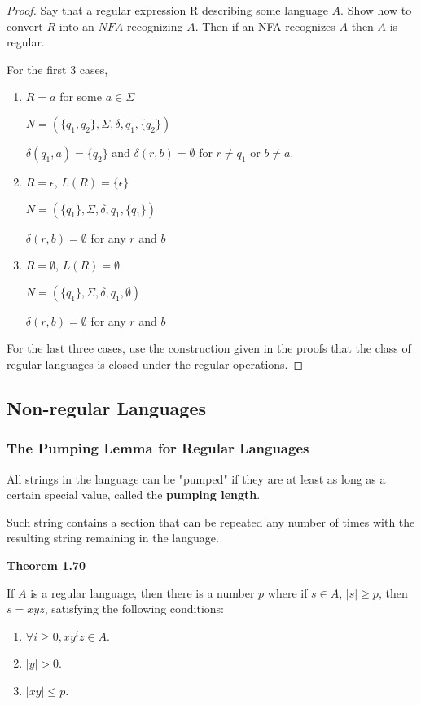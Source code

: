 \begin{mdframed}
\begin{proof}
Say that a regular expression R describing some language $A$. Show how to convert $R$ into an $NFA$ recognizing $A$. Then if  an NFA recognizes $A$ then $A$ is regular.

For the first 3 cases, 
\begin{enumerate}
\item $R=a$ for some $a \in \Sigma$

$N = (\{q_1, q_2\}, \Sigma, \delta, q_1, \{q_2\})$

$\delta(q_1, a) = \{q_2\}$ and $\delta(r, b) = \emptyset$ for $r\neq q_1$ or $b \neq a$.

\item $R = \epsilon$, $L(R) = \{\epsilon\}$

$N = (\{q_1\}, \Sigma, \delta, q_1, \{q_1\})$

$\delta(r, b) = \emptyset$ for any $r$ and $b$

\item $R = \emptyset$, $L(R) = \emptyset$

$N = (\{q_1\}, \Sigma, \delta, q_1, \emptyset)$

$\delta(r, b) = \emptyset$ for any $r$ and $b$
\end{enumerate}

For the last three cases, use the construction given in the proofs that the class of regular languages is closed under the regular operations.
\end{proof}
\end{mdframed}

\subsection{Non-regular Languages}

\subsubsection{The Pumping Lemma for Regular Languages}

All strings in the language can be "pumped" if they are at least as long as a certain special value, called the \textbf{pumping length}.

Such string contains a section that can be repeated any number of times with the resulting string remaining in the language.

\begin{shaded}
\textbf{Theorem 1.70}

\medskip
If $A$ is a regular language, then there is a number $p$ where if $s \in A$, $|s| \geq p$, then $s = xyz$, satisfying the following conditions:
\begin{enumerate}
\item $\forall i \geq 0, x y^i z \in A$.
\item $|y| > 0$.
\item $|xy| \leq p$.
\end{enumerate}
\end{shaded}

